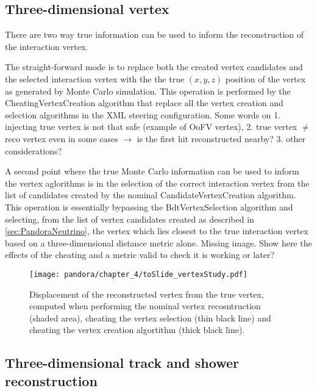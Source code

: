 \subsection{Three-dimensional vertex}

There are two way true information can be used to inform the reconstruction of the interaction vertex. 

The straight-forward mode is to replace both the created vertex candidates and the selected interaction vertex with the the true $(x,y,z)$ position of the vertex as generated by Monte Carlo simulation. This operation is performed by the CheatingVertexCreation algorithm that replace all the vertex creation and selection algorithms in the XML steering configuration. {\color{red} Some words on 1. injecting true vertex is not that safe (example of OoFV vertex), 2. true vertex $\neq$ reco vertex even in some cases $\to$ is the first hit reconstructed nearby? 3. other considerations?}

\begin{figure}
    \centering
    \caption[CheatingVertexCreation and CheatingVertexSelection algorithms]{}
    \label{fig:enter-label}
\end{figure}

A second point where the true Monte Carlo information can be used to inform the vertex aglorithms is in the selection of the correct interaction vertex from the list of candidates created by the nominal CandidateVertexCreation algorithm. This operation is essentially bypassing the BdtVertexSelection algorithm and selecting, from the list of vertex candidates created as described in \autoref{sec:PandoraNeutrino}, the vertex which lies closest to the true interaction vertex based on a three-dimensional distance metric alone. 
{\color{red} Missing image. Show here the effects of the cheating and a metric valid to check it is working or later?}

\begin{figure}
    \centering
    \texttt{[image: pandora/chapter\_4/toSlide\_vertexStudy.pdf]}
    \caption[Vertex displacement from truth]{Displacement of the reconstructed vertex from the true vertex, computed when performing the nominal vertex recosntruction (shaded area), cheating the vertex selection (thin black line) and cheating the vertex creation algortithm (thick black line). }
    \label{fig:enter-label}
\end{figure}


\subsection{Three-dimensional track and shower reconstruction}

